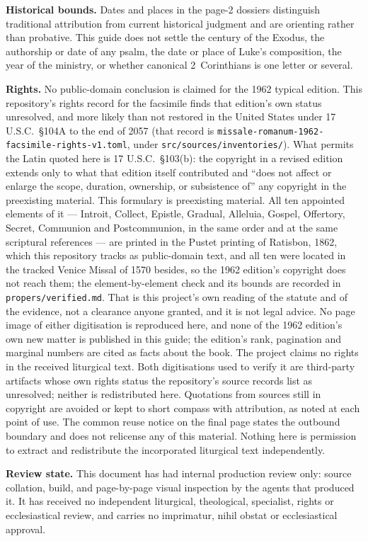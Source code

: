 \textbf{Historical bounds.} Dates and places in the page-2 dossiers
distinguish traditional attribution from current historical judgment and are
orienting rather than probative. This guide does not settle the century of the
Exodus, the authorship or date of any psalm, the date or place of Luke's
composition, the year of the ministry, or whether canonical 2~Corinthians is
one letter or several.

\textbf{Rights.} No public-domain conclusion is claimed for the 1962 typical
edition. This repository's rights record for the facsimile finds that
edition's own status unresolved, and more likely than not restored in the
United States under 17 U.S.C.\ \S104A to the end of 2057 (that record is
\texttt{missale-romanum-1962-facsimile-rights-v1.toml}, under
\texttt{src/sources/inventories/}). What permits the Latin quoted here is
17 U.S.C.\ \S103(b): the copyright in a revised edition extends only to what
that edition itself contributed and ``does not affect or enlarge the scope,
duration, ownership, or subsistence of'' any copyright in the preexisting
material. This formulary is preexisting material. All ten appointed elements
of it --- Introit, Collect, Epistle, Gradual, Alleluia, Gospel, Offertory,
Secret, Communion and Postcommunion, in the same order and at the same
scriptural references --- are printed in the Pustet printing of Ratisbon,
1862, which this repository tracks as public-domain text, and all ten were
located in the tracked Venice Missal of 1570 besides, so the 1962 edition's
copyright does not reach them; the element-by-element check and its bounds are
recorded in \texttt{propers/verified.md}. That is this project's own reading
of the statute and of the evidence, not a clearance anyone granted, and it is
not legal advice. No page image of either digitisation is reproduced here, and
none of the 1962 edition's own new matter is published in this guide; the
edition's rank, pagination and marginal numbers are cited as facts about the
book. The project claims no rights in the received liturgical text. Both
digitisations used to verify it are third-party artifacts whose own rights
status the repository's source records list as unresolved; neither is
redistributed here. Quotations from sources still in copyright are avoided or
kept to short compass with attribution, as noted at each point of use. The
common reuse notice on the final page states the outbound boundary and does
not relicense any of this material. Nothing here is permission to extract and
redistribute the incorporated liturgical text independently.

\textbf{Review state.} This document has had internal production review only:
source collation, build, and page-by-page visual inspection by the agents that
produced it. It has received no independent liturgical, theological,
specialist, rights or ecclesiastical review, and carries no imprimatur, nihil
obstat or ecclesiastical approval.
